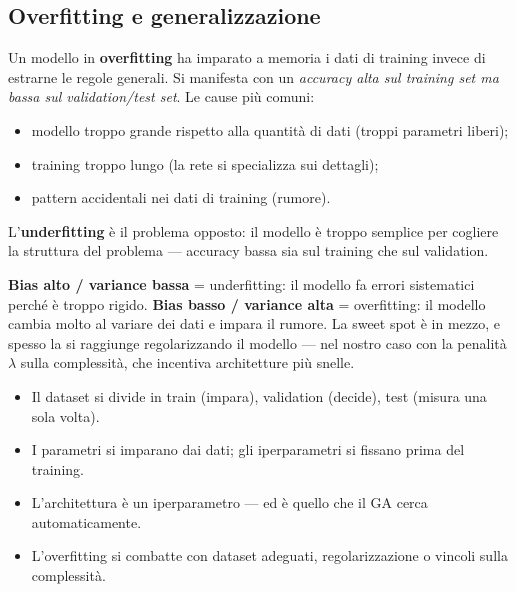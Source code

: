 \documentclass[11pt,a4paper]{article}
\begin{document}
\subsection{Overfitting e generalizzazione}

Un modello in \textbf{overfitting} ha imparato a memoria i dati di
training invece di estrarne le regole generali. Si manifesta con un
\emph{accuracy alta sul training set ma bassa sul validation/test set}.
Le cause più comuni:
\begin{itemize}
    \item modello troppo grande rispetto alla quantità di dati (troppi
          parametri liberi);
    \item training troppo lungo (la rete si specializza sui dettagli);
    \item pattern accidentali nei dati di training (rumore).
\end{itemize}

L'\textbf{underfitting} è il problema opposto: il modello è troppo
semplice per cogliere la struttura del problema --- accuracy bassa sia
sul training che sul validation.

\begin{concetto}
\textbf{Bias alto / variance bassa} = underfitting: il modello fa errori
sistematici perché è troppo rigido.
\textbf{Bias basso / variance alta} = overfitting: il modello cambia
molto al variare dei dati e impara il rumore.
La sweet spot è in mezzo, e spesso la si raggiunge regolarizzando il
modello --- nel nostro caso con la penalità $\lambda$ sulla complessità,
che incentiva architetture più snelle.
\end{concetto}

\begin{riassunto}
\begin{itemize}
    \item Il dataset si divide in train (impara), validation (decide), test (misura una sola volta).
    \item I parametri si imparano dai dati; gli iperparametri si fissano prima del training.
    \item L'architettura è un iperparametro --- ed è quello che il GA cerca automaticamente.
    \item L'overfitting si combatte con dataset adeguati, regolarizzazione o vincoli sulla complessità.
\end{itemize}
\end{riassunto}
\end{document}
